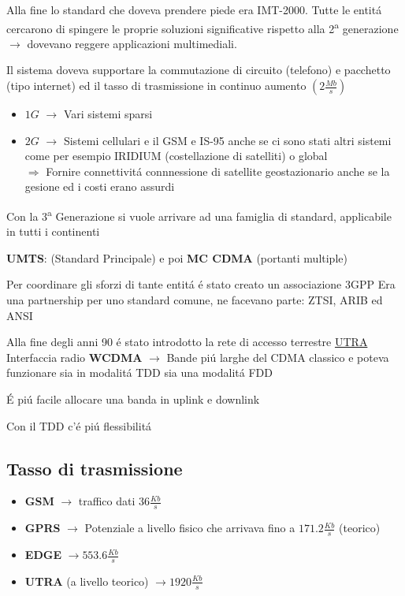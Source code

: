 \documentclass{article}
\begin{document}
Alla fine lo standard che doveva prendere piede era IMT-2000. Tutte le entit\'a cercarono di spingere le proprie soluzioni significative rispetto alla 2\textsuperscript{a} generazione $\rightarrow$ dovevano reggere applicazioni multimediali.

Il sistema doveva supportare la commutazione di circuito (telefono) e pacchetto (tipo internet) ed il tasso di trasmissione in continuo aumento $\left(2\frac{Mb}{s}\right)$

\begin{itemize}
    \item $1G$ $\rightarrow$ Vari sistemi sparsi
    \item $2G$ $\rightarrow$ Sistemi cellulari e il GSM e IS-95 anche se ci sono stati altri sistemi come per esempio IRIDIUM (costellazione di satelliti) o global\\
        $\Rightarrow$ Fornire connettivit\'a connnessione di satellite geostazionario anche se la gesione ed i costi erano assurdi
\end{itemize}

Con la 3\textsuperscript{a} Generazione si vuole arrivare ad una famiglia di standard, applicabile in tutti i continenti

\textbf{UMTS}: (Standard Principale) e poi \textbf{MC CDMA} (portanti multiple)


Per coordinare gli sforzi di tante entit\'a \'e stato creato un associazione 3GPP
Era una partnership per uno standard comune, ne facevano parte: ZTSI, ARIB ed ANSI

Alla fine degli anni 90 \'e stato introdotto la rete di accesso terrestre \underline{UTRA}
Interfaccia radio \textbf{WCDMA} $\rightarrow$ Bande pi\'u larghe del CDMA classico e  poteva funzionare sia in modalit\'a TDD sia una modalit\'a FDD

\'E pi\'u facile allocare una banda in uplink e downlink

Con il TDD c'\'e pi\'u flessibilit\'a


\subsection{Tasso di trasmissione}
\begin{itemize}
    \item \textbf{GSM} $\rightarrow$ traffico dati $36 \frac{Kb}{s}$
    \item \textbf{GPRS} $\rightarrow$ Potenziale a livello fisico che arrivava fino a $171.2\frac{Kb}{s}$ (teorico)
    \item \textbf{EDGE} $\rightarrow 553.6\frac{Kb}{s}$
    \item \textbf{UTRA} (a livello teorico) $\rightarrow 1920\frac{Kb}{s}$
\end{itemize}
\end{document}
